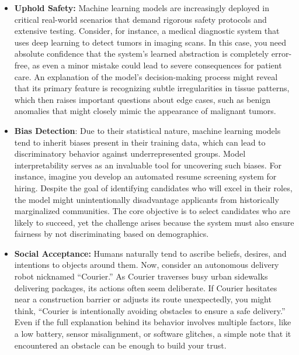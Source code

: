 \begin{itemize}
    \item \textbf{Uphold Safety:} Machine learning models are increasingly deployed in critical real-world scenarios that demand rigorous safety protocols and extensive testing. Consider, for instance, a medical diagnostic system that uses deep learning to detect tumors in imaging scans. In this case, you need absolute confidence that the system's learned abstraction is completely error-free, as even a minor mistake could lead to severe consequences for patient care. An explanation of the model's decision-making process might reveal that its primary feature is recognizing subtle irregularities in tissue patterns, which then raises important questions about edge cases, such as benign anomalies that might closely mimic the appearance of malignant tumors.
    \item \textbf{Bias Detection}: Due to their statistical nature, machine learning models tend to inherit biases present in their training data, which can lead to discriminatory behavior against underrepresented groups. Model interpretability serves as an invaluable tool for uncovering such biases. For instance, imagine you develop an automated resume screening system for hiring. Despite the goal of identifying candidates who will excel in their roles, the model might unintentionally disadvantage applicants from historically marginalized communities. The core objective is to select candidates who are likely to succeed, yet the challenge arises because the system must also ensure fairness by not discriminating based on demographics.
    \item \textbf{Social Acceptance:} Humans naturally tend to ascribe beliefs, desires, and intentions to objects around them. Now, consider an autonomous delivery robot nicknamed “Courier.” As Courier traverses busy urban sidewalks delivering packages, its actions often seem deliberate. If Courier hesitates near a construction barrier or adjusts its route unexpectedly, you might think, “Courier is intentionally avoiding obstacles to ensure a safe delivery.” Even if the full explanation behind its behavior involves multiple factors, like a low battery, sensor misalignment, or software glitches, a simple note that it encountered an obstacle can be enough to build your trust.
\end{itemize}

